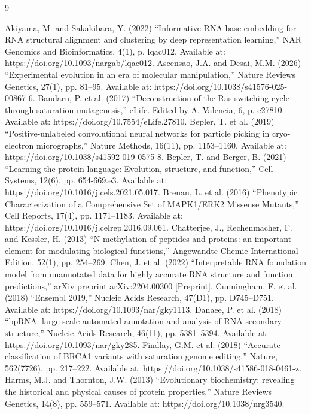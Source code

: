 \documentclass[11pt]{article}
\begin{document}
\begin{thebibliography}{9}


 Akiyama, M. and Sakakibara, Y. (2022) “Informative RNA base embedding for RNA structural alignment and clustering by deep representation learning,” NAR Genomics and Bioinformatics, 4(1), p. lqac012. Available at: https://doi.org/10.1093/nargab/lqac012. 
 Ascensao, J.A. and Desai, M.M. (2026) “Experimental evolution in an era of molecular manipulation,” Nature Reviews Genetics, 27(1), pp. 81–95. Available at: https://doi.org/10.1038/s41576-025-00867-6. 
 Bandaru, P. et al. (2017) “Deconstruction of the Ras switching cycle through saturation mutagenesis,” eLife. Edited by A. Valencia, 6, p. e27810. Available at: https://doi.org/10.7554/eLife.27810. 
 Bepler, T. et al. (2019) “Positive-unlabeled convolutional neural networks for particle picking in cryo-electron micrographs,” Nature Methods, 16(11), pp. 1153–1160. Available at: https://doi.org/10.1038/s41592-019-0575-8. 
 Bepler, T. and Berger, B. (2021) “Learning the protein language: Evolution, structure, and function,” Cell Systems, 12(6), pp. 654-669.e3. Available at: https://doi.org/10.1016/j.cels.2021.05.017. 
 Brenan, L. et al. (2016) “Phenotypic Characterization of a Comprehensive Set of MAPK1/ERK2 Missense Mutants,” Cell Reports, 17(4), pp. 1171–1183. Available at: https://doi.org/10.1016/j.celrep.2016.09.061. 
 Chatterjee, J., Rechenmacher, F. and Kessler, H. (2013) “N‐methylation of peptides and proteins: an important element for modulating biological functions,” Angewandte Chemie International Edition, 52(1), pp. 254–269. 
 Chen, J. et al. (2022) “Interpretable RNA foundation model from unannotated data for highly accurate RNA structure and function predictions,” arXiv preprint arXiv:2204.00300 [Preprint]. 
 Cunningham, F. et al. (2018) “Ensembl 2019,” Nucleic Acids Research, 47(D1), pp. D745–D751. Available at: https://doi.org/10.1093/nar/gky1113. 
 Danaee, P. et al. (2018) “bpRNA: large-scale automated annotation and analysis of RNA secondary structure,” Nucleic Acids Research, 46(11), pp. 5381–5394. Available at: https://doi.org/10.1093/nar/gky285. 
 Findlay, G.M. et al. (2018) “Accurate classification of BRCA1 variants with saturation genome editing,” Nature, 562(7726), pp. 217–222. Available at: https://doi.org/10.1038/s41586-018-0461-z. 
 Harms, M.J. and Thornton, J.W. (2013) “Evolutionary biochemistry: revealing the historical and physical causes of protein properties,” Nature Reviews Genetics, 14(8), pp. 559–571. Available at: https://doi.org/10.1038/nrg3540. 

\end{thebibliography}
\end{document}

